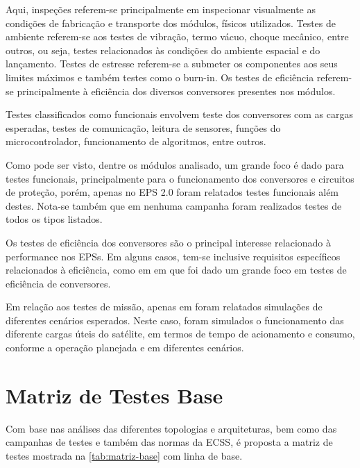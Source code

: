 Aqui, inspeções referem-se principalmente em inspecionar visualmente as condições de fabricação e transporte dos módulos, físicos utilizados.
Testes de ambiente referem-se aos testes de vibração, termo vácuo, choque mecânico, entre outros, ou seja, testes relacionados às condições do ambiente espacial e do lançamento.
Testes de estresse referem-se a submeter os componentes aos seus limites máximos e também testes como o burn-in.
Os testes de eficiência referem-se principalmente à eficiência dos diversos conversores presentes nos módulos.

Testes classificados como funcionais envolvem teste dos conversores com as cargas esperadas, testes de comunicação, leitura de sensores, funções do microcontrolador, funcionamento de algoritmos, entre outros.

Como pode ser visto, dentre os módulos analisado, um grande foco é dado para testes funcionais, principalmente para o funcionamento dos conversores e circuitos de proteção, porém, apenas no EPS 2.0 foram relatados testes funcionais além destes.
Nota-se também que em nenhuma campanha foram realizados testes de todos os tipos listados.

Os testes de eficiência dos conversores são o principal interesse relacionado à performance nos \gls{EPS}s.
Em alguns casos, tem-se inclusive requisitos específicos relacionados à eficiência, como em \textcite{aalto-eps} em que foi dado um grande foco em testes de eficiência de conversores.

Em relação aos testes de missão, apenas em \textcite{mist-eps} foram relatados simulações de diferentes cenários esperados.
Neste caso, foram simulados o funcionamento das diferente cargas úteis do satélite, em termos de tempo de acionamento e consumo, conforme a operação planejada e em diferentes cenários.


\section{Matriz de Testes Base} \label{sec:matriz-base}


Com base nas análises das diferentes topologias e arquiteturas, bem como das campanhas de testes e também das normas da \gls{ECSS}, é proposta a matriz de testes mostrada na \autoref{tab:matriz-base} com linha de base.

